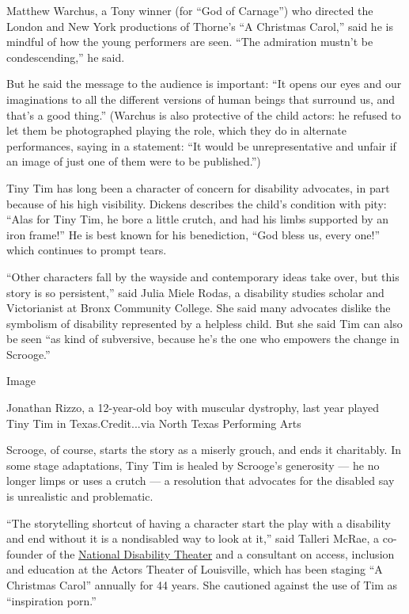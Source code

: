 Matthew Warchus, a Tony winner (for ``God of Carnage'') who directed the
London and New York productions of Thorne's ``A Christmas Carol,'' said
he is mindful of how the young performers are seen. ``The admiration
mustn't be condescending,'' he said.

But he said the message to the audience is important: ``It opens our
eyes and our imaginations to all the different versions of human beings
that surround us, and that's a good thing.'' (Warchus is also protective
of the child actors: he refused to let them be photographed playing the
role, which they do in alternate performances, saying in a statement:
``It would be unrepresentative and unfair if an image of just one of
them were to be published.'')

Tiny Tim has long been a character of concern for disability advocates,
in part because of his high visibility. Dickens describes the child's
condition with pity: ``Alas for Tiny Tim, he bore a little crutch, and
had his limbs supported by an iron frame!'' He is best known for his
benediction, ``God bless us, every one!'' which continues to prompt
tears.

``Other characters fall by the wayside and contemporary ideas take over,
but this story is so persistent,'' said Julia Miele Rodas, a disability
studies scholar and Victorianist at Bronx Community College. She said
many advocates dislike the symbolism of disability represented by a
helpless child. But she said Tim can also be seen ``as kind of
subversive, because he's the one who empowers the change in Scrooge.''

Image

Jonathan Rizzo, a 12-year-old boy with muscular dystrophy, last year
played Tiny Tim in Texas.Credit...via North Texas Performing Arts

Scrooge, of course, starts the story as a miserly grouch, and ends it
charitably. In some stage adaptations, Tiny Tim is healed by Scrooge's
generosity --- he no longer limps or uses a crutch --- a resolution that
advocates for the disabled say is unrealistic and problematic.

``The storytelling shortcut of having a character start the play with a
disability and end without it is a nondisabled way to look at it,'' said
Talleri McRae, a co-founder of the
\href{https://www.nationaldisabilitytheatre.org/}{National Disability
Theater} and a consultant on access, inclusion and education at the
Actors Theater of Louisville, which has been staging ``A Christmas
Carol'' annually for 44 years. She cautioned against the use of Tim as
``inspiration porn.''

